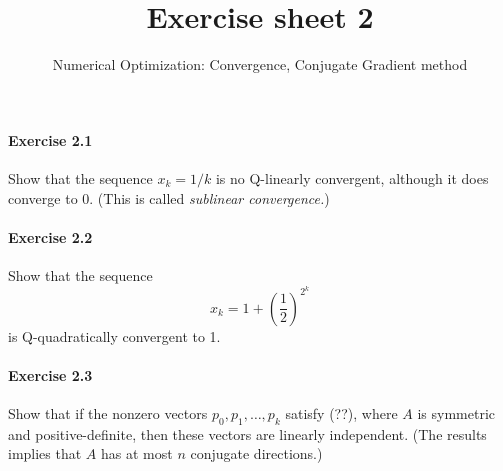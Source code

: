 
\subtitle{Numerical Optimization: Convergence, Conjugate Gradient method}
\title{Exercise sheet 2}
\date{}
\usepackage{amsmath}
\newcommand\tp{\ensuremath{\text{\upshape T}}}

\maketitle

\vspace{-12ex}

\paragraph{Exercise 2.1} %
Show that the sequence $x_k=1/k$ is no Q-linearly convergent, although it does converge to $0$. (This is called \emph{sublinear convergence.})

\paragraph{Exercise 2.2} %
Show that the sequence
\[
x_k = 1 + \left(\frac{1}{2}\right)^{2^k}
\]
is Q-quadratically convergent to 1.




\paragraph{Exercise 2.3}  %
Show that if the nonzero vectors $p_0, p_1,\dots, p_k$ satisfy (??), where $A$
is symmetric and positive-definite, then these vectors are linearly
independent. (The results implies that $A$ has at most $n$ conjugate
directions.)

